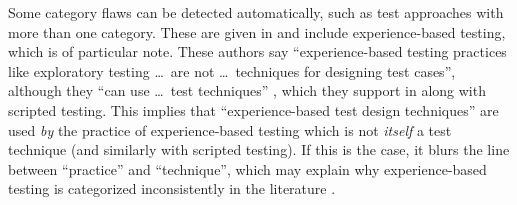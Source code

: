 

\ifnotpaper\else\fi

\label{multiCats}

Some category flaws can be detected automatically, such as test
approaches with more than one category. These are given in 
and include experience-based testing, which is of particular note.
\expBasedCatMain{} These authors say ``experience-based testing practices like
exploratory testing \dots\ are not \dots\ techniques for designing test cases'',
although they ``can use \dots\ test techniques'' \citeyearpar[p.~viii]{IEEE2021},
which they support in \citeyearpar[p.~33]{IEEE2022} along with scripted testing.
This implies that ``experience-based test design techniques'' are used \emph{by}
the practice of experience-based testing which is not \emph{itself} a test
technique (and similarly with scripted testing). If this is the case, it blurs
the line between ``practice'' and ``technique'', which may explain why
experience-based testing is categorized inconsistently in the literature%
.

